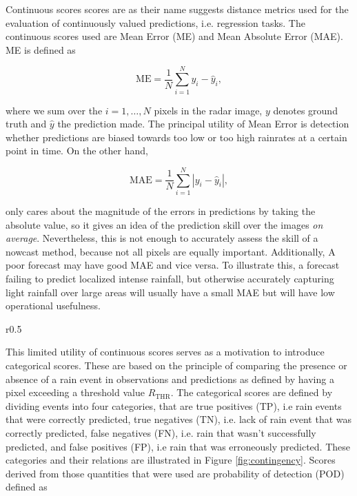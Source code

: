 Continuous scores scores are as their name suggests distance metrics used for the evaluation of continuously valued predictions, i.e. regression tasks. The continuous scores used are Mean Error (ME) and Mean Absolute Error (MAE). ME is defined as 

\begin{equation}
	\text{ME} = \frac{1}{N}\sum_{i=1}^{N} y_i - \hat{y}_i,
\end{equation}

where we sum over the $i=1,\dots,N$ pixels in the radar image, $y$ denotes ground truth and $\hat{y}$ the prediction made. The principal utility of Mean Error is detection whether predictions are biased towards too low or too high rainrates at a certain point in time. On the other hand, 

\begin{equation}
	\text{MAE} = \frac{1}{N}\sum_{i=1}^{N} |y_i - \hat{y}_i|,
\end{equation}

only cares about the magnitude of the errors in predictions by taking the absolute value, so it gives an idea of the prediction skill over the images \textit{on average}. Nevertheless, this is not enough to accurately assess the skill of a nowcast method, because not all pixels are equally important. Additionally, A poor forecast may have good MAE and vice versa. To illustrate this, a forecast failing to predict localized intense rainfall, but otherwise accurately capturing light rainfall over large areas will usually have a small MAE but will have low operational usefulness.


\begin{wrapfigure}{r}{0.5\textwidth}
	\label{fig:contingency}
	\begin{center}
	\end{center}
	\caption{Categories used, illustrated using a contingency table.}
\end{wrapfigure}


This limited utility of continuous scores serves as a motivation to introduce categorical scores. These are based on the principle of comparing the presence or absence of a rain event in observations and predictions as defined by having a pixel exceeding a threshold value $R_{\text{THR}}$. The categorical scores are defined by dividing events into four categories, that are true positives (TP), i.e rain events that were correctly predicted, true negatives (TN), i.e. lack of rain event that was correctly predicted, false negatives (FN), i.e. rain that wasn't successfully predicted, and false positives (FP), i.e rain that was erroneously predicted. These categories and their relations are illustrated in Figure \ref{fig:contingency}. Scores derived from those quantities that were used are probability of detection (POD) defined as

